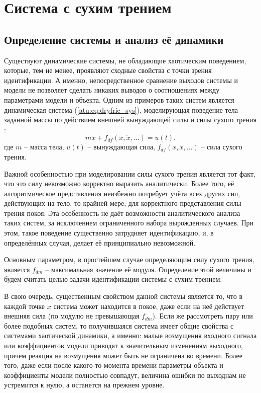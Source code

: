 
\FloatBarrier
\section{Система с сухим трением} %
\label{atu:sect:fric}


\subsection{Определение системы и анализ её динамики} %


Существуют динамические системы, не обладающие хаотическим поведением,
которые, тем не менее, проявляют сходные свойства с точки зрения идентификации.
А именно, непосредственное сравнение выходов системы и модели не позволяет
сделать никаких выводов о соотношениях между параметрами модели и объекта.
Одним из примеров таких систем является динамическая система (\ref{atu:eq:dryfric_sys}),
моделирующая поведение тела заданной массы по действием внешней вынуждающей силы
и силы сухого трения
\cite{berger_friction,atu_asau11}:
%
\begin{equation}
  m \ddot{x} + f_{df}( x, \dot{x}, \ldots)  = u(t).
\label{atu:eq:dryfric_sys}
\end{equation}
%
где
$m$ -- масса тела,
$u(t)$ -- вынуждающая сила,
$ f_{df}( x, \dot{x}, \ldots)  $ -- сила сухого трения.

Важной особенностью при моделировании силы сухого трения является тот факт,
что это силу невозможно корректно выразить аналитически. Более того,
её алгоритмическое представления неизбежно потребует учёта всех других сил,
действующих на тело, то крайней мере, для корректного представления
силы трения покоя. Эта особенность не даёт возможности
аналитического анализа таких систем, за исключением ограниченного набора
вырожденных случаев. При этом, такое поведение существенно затрудняет идентификацию,
и, в определённых случая, делает её принципиально невозможной.

Основным параметром, в простейшем случае определяющим силу сухого
трения, является $f_{dm}$ -- максимальная значение её модуля.
Определение этой величины и будем считать целью задачи идентификации
системы с сухим трением.

В свою очередь, существенным свойством данной системы является то, что в каждой точке \(x\)
система может находится в покое, даже если на неё действует
внешняя сила (по модулю не превышающая $f_{dm}$).
Если же рассмотреть пару или более подобных систем,
то получившаяся система имеет общие свойства с системами
хаотической динамики, а именно: малые возмущения входного сигнала
или коэффициентов модели приводят к значительным изменениям
выходного, причем реакция на возмущения может быть
не ограничена во времени.
Более того, даже если после какого-то момента времени
параметры объекта и коэффициенты модели полностью совпадут,
величина ошибки по выходнам не устремится к нулю, а останется на прежнем уровне.


